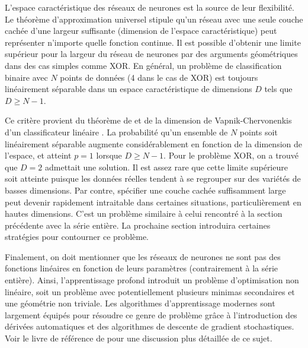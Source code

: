 L'espace caractéristique des réseaux de neurones est la source de leur flexibilité. Le théorème d'approximation universel 
\citep{Cybenko1989,Hornik1991} stipule 
qu'un réseau avec une seule couche cachée d'une largeur suffisante (dimension de l'espace caractéristique) peut représenter 
n'importe quelle fonction continue.
Il est possible d'obtenir une limite supérieur pour la largeur du réseau de neurones par des arguments géométriques dans des cas simples comme XOR.
En général, un problème de classification binaire avec $N$ points de données (4 dans le cas de XOR) est toujours linéairement séparable dans 
un espace caractéristique de dimensions $D$ tels que $D \geq N - 1$. 

Ce critère provient du théorème de \citet{Cover1965} et de la dimension de Vapnik-Chervonenkis d'un classificateur linéaire \citep{Vapnik1971,Vapnik1995}. 
La probabilité qu'un ensemble de $N$ points soit linéairement séparable augmente 
considérablement en fonction de la dimension de l'espace, et atteint $p = 1$ lorsque $D \geq N -1$.
Pour le problème XOR, on a trouvé que $D=2$ admettait une solution. 
Il est assez rare que cette limite supérieure soit 
atteinte puisque les données réelles tendent à se regrouper sur des variétés de basses dimensions. 
Par contre, spécifier une couche cachée suffisamment large peut devenir rapidement intraitable dans certaines situations, 
particulièrement en hautes dimensions. C'est un problème similaire à celui rencontré à la section précédente avec la série entière. 
La prochaine section introduira certaines stratégies pour contourner ce problème.

Finalement, on doit mentionner que les réseaux de neurones 
ne sont pas des fonctions linéaires en fonction de leurs paramètres (contrairement à la série entière). 
Ainsi, l'apprentissage profond introduit un problème d'optimisation non linéaire, soit un problème avec 
potentiellement plusieurs minimas secondaires et une géométrie non triviale.
Les algorithmes d'apprentissage modernes
sont largement équipés pour résoudre ce genre de problème grâce à l'introduction des dérivées automatiques et 
des algorithmes de descente de gradient stochastiques. Voir le livre de référence de \citet{Goodfellow2016} 
pour une discussion plus détaillée de ce sujet.

